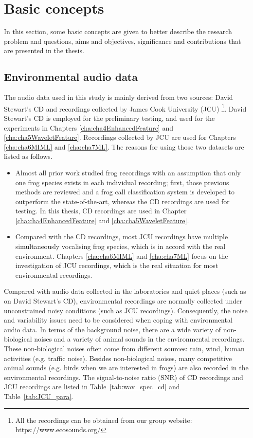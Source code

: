 \section{Basic concepts} 
In this section, some basic concepts are given to better describe the research problem and questions, aims and objectives, significance and contributions that are presented in the thesis.

\subsection{Environmental audio data}
The audio data used in this study is mainly derived from two sources: David Stewart's CD \citep{CD} and recordings collected by James Cook University (JCU) \footnote{All the recordings can be obtained from our group website: https://www.ecosounds.org/}. 
David Stewart's CD is employed for the preliminary testing, and used for the experiments in Chapters \ref{cha:cha4EnhancedFeature} and \ref{cha:cha5WaveletFeature}. 
Recordings collected by JCU are used for Chapters \ref{cha:cha6MIML} and \ref{cha:cha7ML}. 
The reasons for using those two datasets are listed as follows.
\begin{itemize}
\item  Almost all prior work studied frog recordings with an assumption that only one frog species exists in each individual recording; first, those previous methods are reviewed and a frog call classification system is developed to outperform the state-of-the-art, whereas the CD recordings are used for testing. In this thesis, CD recordings are used in Chapter \ref{cha:cha4EnhancedFeature} and \ref{cha:cha5WaveletFeature}.


\item  Compared with the CD recordings, most JCU recordings have multiple simultaneously vocalising frog species, which is in accord with the real environment. Chapters \ref{cha:cha6MIML} and \ref{cha:cha7ML} focus on the investigation of JCU recordings, which is the real situation for most environmental recordings. 


\end{itemize}


Compared with audio data collected in the laboratories and quiet places (such as on David Stewart’s CD), environmental recordings are normally collected under unconstrained noisy conditions (such as JCU recordings). Consequently, the noise and variability issues need to be considered when coping with environmental audio data. 
In terms of the background noise, there are a wide variety of non-biological noises and a variety of animal sounds in the environmental recordings. These non-biological noises often come from different sources: rain, wind, human activities (e.g. traffic noise). Besides non-biological noises, many competitive animal sounds (e.g. birds when we are interested in frogs) are also recorded in the environmental recordings. The signal-to-noise ratio (SNR) of CD recordings and JCU recordings are listed in 
Table~\ref{tab:wav_spec_cd} and Table~\ref{tab:JCU_para}. 


